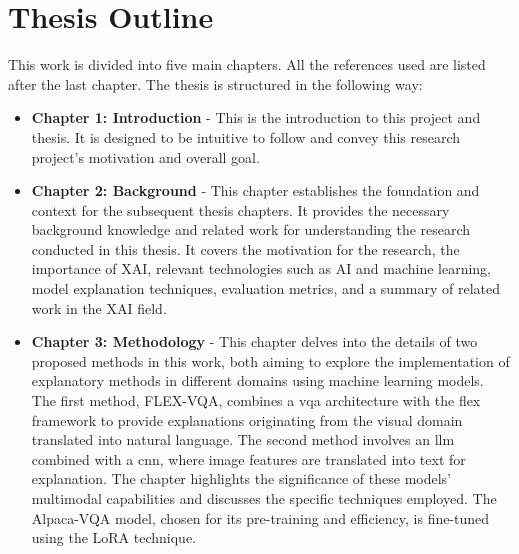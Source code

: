 \label{sec:1_7_thesis_outline}

\begin{comment}
Describe how you have divided your thesis into chapters, and briefly list what the reader will find in each chapter.
\end{comment}

\section{Thesis Outline}

This work is divided into five main chapters.
All the references used are listed after the last chapter. 
The thesis is structured in the following way:

\begin{itemize}

    \item \textbf{Chapter 1: Introduction} - This is the introduction to this project and thesis. It is designed to be intuitive to follow and convey this research project's motivation and overall goal.
    
    \item \textbf{Chapter 2: Background} - This chapter establishes the foundation and context for the subsequent thesis chapters. It provides the necessary background knowledge and related work for understanding the research conducted in this thesis. It covers the motivation for the research, the importance of XAI, relevant technologies such as AI and machine learning, model explanation techniques, evaluation metrics, and a summary of related work in the XAI field.
    
    \item \textbf{Chapter 3: Methodology} - This chapter delves into the details of two proposed methods in this work, both aiming to explore the implementation of explanatory methods in different domains using machine learning models. The first method, FLEX-VQA, combines a \gls{vqa} architecture with the \gls{flex} framework to provide explanations originating from the visual domain translated into natural language. The second method involves an \gls{llm} combined with a \gls{cnn}, where image features are translated into text for explanation. 
    The chapter highlights the significance of these models' multimodal capabilities and discusses the specific techniques employed. The Alpaca-VQA model, chosen for its pre-training and efficiency, is fine-tuned using the LoRA technique.


\end{itemize}
